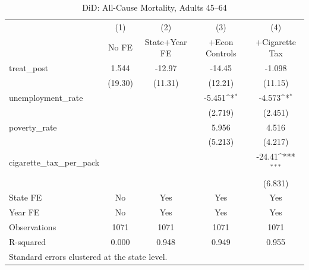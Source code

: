 \begin{table}[htbp]\centering
\def\sym#1{\ifmmode^{#1}\else\(^{#1}\)\fi}
\caption{DiD: All-Cause Mortality, Adults 45--64}
\begin{tabular}{l*{4}{c}}
\toprule
                    &\multicolumn{1}{c}{(1)}&\multicolumn{1}{c}{(2)}&\multicolumn{1}{c}{(3)}&\multicolumn{1}{c}{(4)}\\
                    &\multicolumn{1}{c}{No FE}&\multicolumn{1}{c}{State+Year FE}&\multicolumn{1}{c}{+Econ Controls}&\multicolumn{1}{c}{+Cigarette Tax}\\
\midrule
treat\_post          &       1.544         &      -12.97         &      -14.45         &      -1.098         \\
                    &     (19.30)         &     (11.31)         &     (12.21)         &     (11.15)         \\
\addlinespace
unemployment\_rate   &                     &                     &      -5.451\sym{*}  &      -4.573\sym{*}  \\
                    &                     &                     &     (2.719)         &     (2.451)         \\
\addlinespace
poverty\_rate        &                     &                     &       5.956         &       4.516         \\
                    &                     &                     &     (5.213)         &     (4.217)         \\
\addlinespace
cigarette\_tax\_per\_pack&                     &                     &                     &      -24.41\sym{***}\\
                    &                     &                     &                     &     (6.831)         \\
\midrule
State FE            &          No         &         Yes         &         Yes         &         Yes         \\
Year FE             &          No         &         Yes         &         Yes         &         Yes         \\
Observations        &        1071         &        1071         &        1071         &        1071         \\
R-squared           &       0.000         &       0.948         &       0.949         &       0.955         \\
\bottomrule
\multicolumn{5}{l}{\footnotesize Standard errors clustered at the state level.}\\
\end{tabular}
\end{table}
